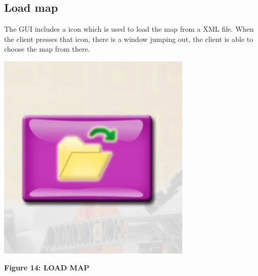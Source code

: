 \documentclass[11pt, a4paper]{report}
\begin{document}
\subsection{Load map}
The GUI includes a icon which is used to load the map from a XML file. When the client presses that icon, there is a window jumping out, the client is able to choose the map from there.
\begin{center}
 \includegraphics[width=9.20cm]{load}
\end{center}
\begin{center}
\textbf {Figure 14: LOAD MAP} \\[0.3cm]
\end{center}
\end{document}
